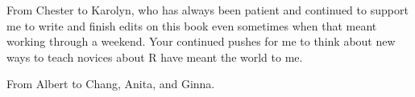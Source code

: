 
\cleardoublepage\newpage
\thispagestyle{empty}

\begin{center}
From Chester to Karolyn, who has always been patient and continued to support me to write and finish edits on this book even sometimes when that meant working through a weekend.  Your continued pushes for me to think about new ways to teach novices about R have meant the world to me.

From Albert to Chang, Anita, and Ginna.
\end{center}

\setlength{\abovedisplayskip}{-5pt}
\setlength{\abovedisplayshortskip}{-5pt}
